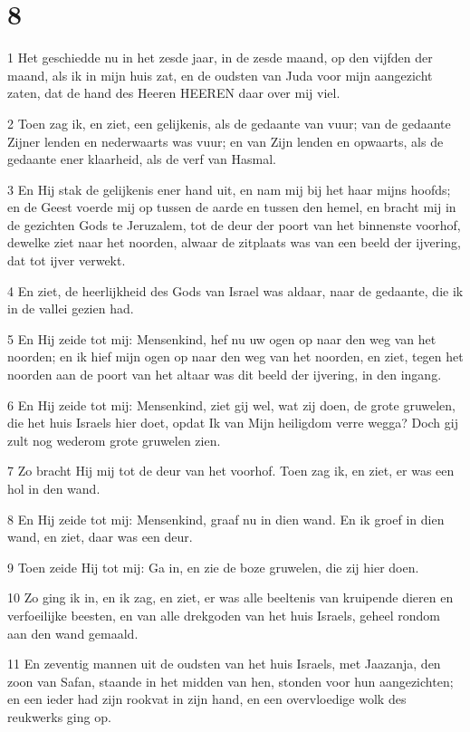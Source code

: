 \chapter{8}

\par 1 Het geschiedde nu in het zesde jaar, in de zesde maand, op den vijfden der maand, als ik in mijn huis zat, en de oudsten van Juda voor mijn aangezicht zaten, dat de hand des Heeren HEEREN daar over mij viel.
\par 2 Toen zag ik, en ziet, een gelijkenis, als de gedaante van vuur; van de gedaante Zijner lenden en nederwaarts was vuur; en van Zijn lenden en opwaarts, als de gedaante ener klaarheid, als de verf van Hasmal.
\par 3 En Hij stak de gelijkenis ener hand uit, en nam mij bij het haar mijns hoofds; en de Geest voerde mij op tussen de aarde en tussen den hemel, en bracht mij in de gezichten Gods te Jeruzalem, tot de deur der poort van het binnenste voorhof, dewelke ziet naar het noorden, alwaar de zitplaats was van een beeld der ijvering, dat tot ijver verwekt.
\par 4 En ziet, de heerlijkheid des Gods van Israel was aldaar, naar de gedaante, die ik in de vallei gezien had.
\par 5 En Hij zeide tot mij: Mensenkind, hef nu uw ogen op naar den weg van het noorden; en ik hief mijn ogen op naar den weg van het noorden, en ziet, tegen het noorden aan de poort van het altaar was dit beeld der ijvering, in den ingang.
\par 6 En Hij zeide tot mij: Mensenkind, ziet gij wel, wat zij doen, de grote gruwelen, die het huis Israels hier doet, opdat Ik van Mijn heiligdom verre wegga? Doch gij zult nog wederom grote gruwelen zien.
\par 7 Zo bracht Hij mij tot de deur van het voorhof. Toen zag ik, en ziet, er was een hol in den wand.
\par 8 En Hij zeide tot mij: Mensenkind, graaf nu in dien wand. En ik groef in dien wand, en ziet, daar was een deur.
\par 9 Toen zeide Hij tot mij: Ga in, en zie de boze gruwelen, die zij hier doen.
\par 10 Zo ging ik in, en ik zag, en ziet, er was alle beeltenis van kruipende dieren en verfoeilijke beesten, en van alle drekgoden van het huis Israels, geheel rondom aan den wand gemaald.
\par 11 En zeventig mannen uit de oudsten van het huis Israels, met Jaazanja, den zoon van Safan, staande in het midden van hen, stonden voor hun aangezichten; en een ieder had zijn rookvat in zijn hand, en een overvloedige wolk des reukwerks ging op.

